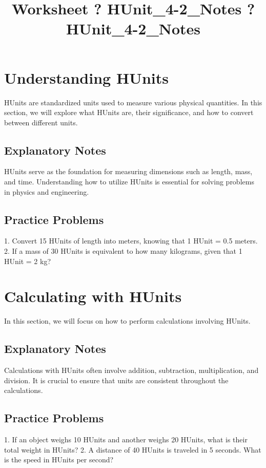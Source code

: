 \documentclass{article}
\title{Worksheet ? HUnit\_4-2\_Notes ? HUnit\_4-2\_Notes}
\author{}
\date{}
\begin{document}
\maketitle

\section*{Understanding HUnits}
HUnits are standardized units used to measure various physical quantities. In this section, we will explore what HUnits are, their significance, and how to convert between different units.

\subsection*{Explanatory Notes}
HUnits serve as the foundation for measuring dimensions such as length, mass, and time. Understanding how to utilize HUnits is essential for solving problems in physics and engineering.

\subsection*{Practice Problems}
1. Convert 15 HUnits of length into meters, knowing that 1 HUnit = 0.5 meters.
2. If a mass of 30 HUnits is equivalent to how many kilograms, given that 1 HUnit = 2 kg?

\section*{Calculating with HUnits}
In this section, we will focus on how to perform calculations involving HUnits.

\subsection*{Explanatory Notes}
Calculations with HUnits often involve addition, subtraction, multiplication, and division. It is crucial to ensure that units are consistent throughout the calculations.

\subsection*{Practice Problems}
1. If an object weighs 10 HUnits and another weighs 20 HUnits, what is their total weight in HUnits?
2. A distance of 40 HUnits is traveled in 5 seconds. What is the speed in HUnits per second?
\end{document}

